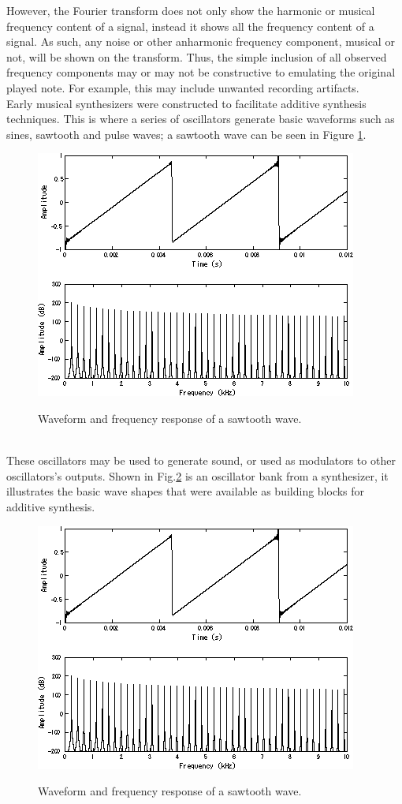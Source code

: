 \documentclass{article}
\begin{document}
        However, the Fourier transform does not only show the harmonic or musical frequency content of a signal, instead it shows all the frequency content of a signal.
        As such, any noise or other anharmonic frequency component, musical or not, will be shown on the transform.
        Thus, the simple inclusion of all observed frequency components may or may not be constructive to emulating the original played note.
        For example, this may include unwanted recording artifacts.
        \\
        Early musical synthesizers were constructed to facilitate additive synthesis techniques.
        This is where a series of oscillators generate basic waveforms such as sines, sawtooth and pulse waves; a sawtooth wave can be seen in Figure \ref{sawtooth}.
        \begin{figure}[h]
            \includegraphics[scale=0.6]{images/Sawtooth.png}%
            \centering
            \caption{Waveform and frequency response of a sawtooth wave.}\cite{kraft2017lp}
            \label{sawtooth}
        \end{figure}
        \\
        These oscillators may be used to generate sound, or used as modulators to other oscillators's outputs.
        Shown in Fig.\ref{oscBank} is an oscillator bank from a synthesizer, it illustrates the basic wave shapes that were available as building blocks for additive synthesis.
        \begin{figure}[h]
            \includegraphics[scale=0.6]{images/Sawtooth.png}%
            \centering
            \caption{Waveform and frequency response of a sawtooth wave.}\cite{kraft2017lp}
            \label{oscBank}
        \end{figure}
\end{document}
